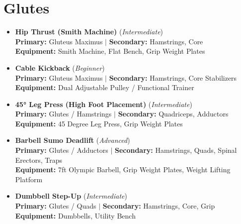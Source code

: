 \documentclass[11pt,a4paper]{article}
\begin{document}
\section*{Glutes}
\begin{itemize}[leftmargin=*]
  \item \textbf{Hip Thrust (Smith Machine)} (\textit{Intermediate})\\
        \textbf{Primary:} Gluteus Maximus $|$ \textbf{Secondary:} Hamstrings, Core\\
        \textbf{Equipment:} Smith Machine, Flat Bench, Grip Weight Plates
  \item \textbf{Cable Kickback} (\textit{Beginner})\\
        \textbf{Primary:} Gluteus Maximus $|$ \textbf{Secondary:} Hamstrings, Core Stabilizers\\
        \textbf{Equipment:} Dual Adjustable Pulley / Functional Trainer
  \item \textbf{45° Leg Press (High Foot Placement)} (\textit{Intermediate})\\
        \textbf{Primary:} Glutes / Hamstrings $|$ \textbf{Secondary:} Quadriceps, Adductors\\
        \textbf{Equipment:} 45 Degree Leg Press, Grip Weight Plates
  \item \textbf{Barbell Sumo Deadlift} (\textit{Advanced})\\
        \textbf{Primary:} Glutes / Adductors $|$ \textbf{Secondary:} Hamstrings, Quads, Spinal Erectors, Traps\\
        \textbf{Equipment:} 7ft Olympic Barbell, Grip Weight Plates, Weight Lifting Platform
  \item \textbf{Dumbbell Step-Up} (\textit{Intermediate})\\
        \textbf{Primary:} Glutes / Quads $|$ \textbf{Secondary:} Hamstrings, Core, Grip\\
        \textbf{Equipment:} Dumbbells, Utility Bench
\end{itemize}
\vspace{0.5em}
\end{document}
